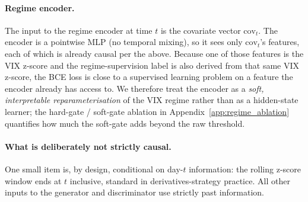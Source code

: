 \paragraph{Regime encoder.}
The input to the regime encoder at time $t$ is the covariate vector $\text{cov}_t$. The encoder is a pointwise MLP (no temporal mixing), so it sees only $\text{cov}_t$'s features, each of which is already causal per the above. Because one of those features is the VIX z-score and the regime-supervision label is also derived from that same VIX z-score, the BCE loss is close to a supervised learning problem on a feature the encoder already has access to. We therefore treat the encoder as a \emph{soft, interpretable reparameterisation} of the VIX regime rather than as a hidden-state learner; the hard-gate / soft-gate ablation in Appendix~\ref{app:regime_ablation} quantifies how much the soft-gate adds beyond the raw threshold.

\paragraph{What is deliberately not strictly causal.}
One small item is, by design, conditional on day-$t$ information: the rolling z-score window ends at $t$ inclusive, standard in derivatives-strategy practice. All other inputs to the generator and discriminator use strictly past information.
